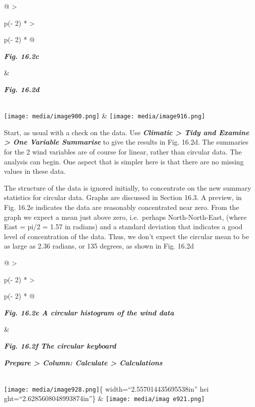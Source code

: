 \documentclass[
  letterpaper,
  DIV=11,
  numbers=noendperiod]{scrreprt}
\begin{document}
\begin{longtable}[]{@{}
  >{\raggedright\arraybackslash}p{(\columnwidth - 2\tabcolsep) * }
  >{\raggedright\arraybackslash}p{(\columnwidth - 2\tabcolsep) * }@{}}
\toprule\noalign{}
\begin{minipage}[b]{\linewidth}\raggedright
\textbf{\emph{Fig. 16.2c}}
\end{minipage} & \begin{minipage}[b]{\linewidth}\raggedright
\textbf{\emph{Fig. 16.2d}}
\end{minipage} \\
\midrule\noalign{}
\endhead
\bottomrule\noalign{}
\endlastfoot
\texttt{[image: media/image900.png]} &
\texttt{[image: media/image916.png]} \\
\end{longtable}

Start, as usual with a check on the data. Use \textbf{\emph{Climatic
\textgreater{} Tidy and Examine \textgreater{} One Variable Summarise}}
to give the results in Fig. 16.2d. The summaries for the 2 wind
variables are of course for linear, rather than circular data. The
analysis can begin. One aspect that is simpler here is that there are no
missing values in these data.

The structure of the data is ignored initially, to concentrate on the
new summary statistics for circular data. Graphs are discussed in
Section 16.3. A preview, in Fig. 16.2e indicates the data are reasonably
concentrated near zero. From the graph we expect a mean just above zero,
i.e.~perhaps North-North-East, (where East = pi/2 = 1.57 in radians) and
a standard deviation that indicates a good level of concentration of the
data. Thus, we don't expect the circular mean to be as large as 2.36
radians, or 135 degrees, as shown in Fig. 16.2d

\begin{longtable}[]{@{}
  >{\raggedright\arraybackslash}p{(\columnwidth - 2\tabcolsep) * }
  >{\raggedright\arraybackslash}p{(\columnwidth - 2\tabcolsep) * }@{}}
\toprule\noalign{}
\begin{minipage}[b]{\linewidth}\raggedright
\textbf{\emph{Fig. 16.2e A circular histogram of the wind data}}
\end{minipage} & \begin{minipage}[b]{\linewidth}\raggedright
\textbf{\emph{Fig. 16.2f The circular keyboard}}

\textbf{\emph{Prepare \textgreater{} Column: Calculate \textgreater{}
Calculations}}
\end{minipage} \\
\midrule\noalign{}
\endhead
\bottomrule\noalign{}
\endlastfoot
\texttt{[image: media/image928.png]}\{ width=``2.557014435695538in'' hei
ght=``2.6285608048993874in''\} &
\texttt{[image: media/imag e921.png]} \\
\end{longtable}
\end{document}
